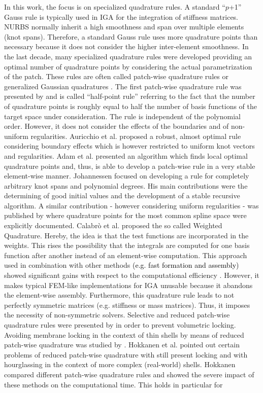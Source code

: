 \documentclass[3p]{elsarticle}
\newcommand{\reviewed}{\textcolor{black}}	%
\begin{document}
In this work, the focus is on specialized quadrature rules. A standard ``$p$+1'' Gauss rule is typically used in IGA for the integration of stiffness matrices. NURBS normally inherit a high smoothness and span over multiple elements (knot spans). Therefore, a standard Gauss rule uses more quadrature points than necessary because it does not consider the higher inter-element smoothness. In the last decade, many specialized quadrature rules were developed providing an optimal number of quadrature points by considering the actual parametrization of the patch. These rules are often called patch-wise quadrature rules \cite{Teschemacher2018,Leonetti2018} or generalized Gaussian quadratures \cite{Calabro2019}. The first patch-wise quadrature rule was presented by \cite{Hughes2010} and is called ``half-point rule'' referring to the fact that the number of quadrature points is roughly equal to half the number of basis functions of the target space under consideration. The rule is independent of the polynomial order. However, it does not consider the effects of the boundaries and of non-uniform regularities. Auricchio et al. \cite{Auricchio2012} proposed a robust, almost optimal rule considering boundary effects which is however restricted to uniform knot vectors and regularities. Adam et al. \cite{Adam2015} presented an algorithm which finds local optimal quadrature points and, thus, is able to develop a patch-wise rule in a very stable element-wise manner. Johannessen \cite{Johannessen2017} focused on developing a rule for completely arbitrary knot spans and polynomial degrees. His main contributions were the determining of good initial values and the development of a stable recursive algorithm. A similar contribution - however considering uniform regularities - was published by \cite{Hiemstra2017} where quadrature points for the most common spline space were explicitly documented. Calabrò et al. \cite{Calabro2017} proposed the so called Weighted Quadrature. Hereby, the idea is that the test functions are incorporated in the weights. This rises the possibility that the integrals are computed for one basis function after another instead of an element-wise computation. This approach used in combination with other methods \reviewed{(e.g. fast formation and assembly)} showed significant gains with respect to the computational efficiency \cite{Sangalli2018,Hiemstra2019,Giannelli2021}. However, it makes typical FEM-like implementations for IGA unusable because it abandons the element-wise assembly. Furthermore, this quadrature rule leads to not perfectly symmetric matrices (e.g. stiffness or mass matrices). Thus, it imposes the necessity of non-symmetric solvers. Selective and reduced patch-wise quadrature rules were presented by \cite{Adam2015} in order to prevent volumetric locking. Avoiding membrane locking in the context of thin shells by means of reduced patch-wise quadrature was studied by \cite{Leonetti2019}. Hokkanen et al. \cite{Hokkanen2020} pointed out certain problems of reduced patch-wise quadrature with still present locking and with hourglassing in the context of more complex (real-world) shells. Hokkanen \cite{Hokkanen2019} compared different patch-wise quadrature rules and showed the severe impact of these methods on the computational time. This holds in particular for 
\end{document}
